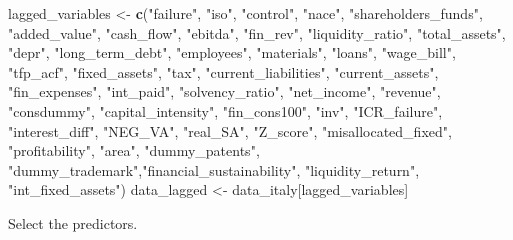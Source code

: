 \documentclass[]{article}
\newenvironment{Shaded}{\begin{snugshade}}{\end{snugshade}}
\newcommand{\KeywordTok}[1]{\textcolor[rgb]{0.13,0.29,0.53}{\textbf{#1}}}
\newcommand{\NormalTok}[1]{#1}
\newcommand{\StringTok}[1]{\textcolor[rgb]{0.31,0.60,0.02}{#1}}
\begin{document}
\begin{Shaded}
\begin{Highlighting}[]
\NormalTok{lagged_variables <-}\StringTok{ }\KeywordTok{c}\NormalTok{(}\StringTok{"failure"}\NormalTok{, }\StringTok{"iso"}\NormalTok{, }\StringTok{"control"}\NormalTok{, }\StringTok{"nace"}\NormalTok{,}
                      \StringTok{"shareholders_funds"}\NormalTok{, }\StringTok{"added_value"}\NormalTok{,}
                      \StringTok{"cash_flow"}\NormalTok{, }\StringTok{"ebitda"}\NormalTok{, }\StringTok{"fin_rev"}\NormalTok{,}
                      \StringTok{"liquidity_ratio"}\NormalTok{, }\StringTok{"total_assets"}\NormalTok{,}
                      \StringTok{"depr"}\NormalTok{, }\StringTok{"long_term_debt"}\NormalTok{, }\StringTok{"employees"}\NormalTok{,}
                      \StringTok{"materials"}\NormalTok{, }\StringTok{"loans"}\NormalTok{, }\StringTok{"wage_bill"}\NormalTok{,}
                      \StringTok{"tfp_acf"}\NormalTok{, }\StringTok{"fixed_assets"}\NormalTok{, }\StringTok{"tax"}\NormalTok{,}
                      \StringTok{"current_liabilities"}\NormalTok{, }\StringTok{"current_assets"}\NormalTok{,}
                      \StringTok{"fin_expenses"}\NormalTok{, }\StringTok{"int_paid"}\NormalTok{,}
                      \StringTok{"solvency_ratio"}\NormalTok{, }\StringTok{"net_income"}\NormalTok{,}
                      \StringTok{"revenue"}\NormalTok{, }\StringTok{"consdummy"}\NormalTok{, }\StringTok{"capital_intensity"}\NormalTok{,}
                      \StringTok{"fin_cons100"}\NormalTok{, }\StringTok{"inv"}\NormalTok{, }\StringTok{"ICR_failure"}\NormalTok{,}
                      \StringTok{"interest_diff"}\NormalTok{, }\StringTok{"NEG_VA"}\NormalTok{, }\StringTok{"real_SA"}\NormalTok{,}
                      \StringTok{"Z_score"}\NormalTok{, }\StringTok{"misallocated_fixed"}\NormalTok{,}
                      \StringTok{"profitability"}\NormalTok{, }\StringTok{"area"}\NormalTok{, }\StringTok{"dummy_patents"}\NormalTok{,}
                      \StringTok{"dummy_trademark"}\NormalTok{,}\StringTok{"financial_sustainability"}\NormalTok{,}
                      \StringTok{"liquidity_return"}\NormalTok{, }\StringTok{"int_fixed_assets"}\NormalTok{)}
\NormalTok{data_lagged <-}\StringTok{ }\NormalTok{data_italy[lagged_variables]}
\end{Highlighting}
\end{Shaded}

Select the predictors.
\end{document}

